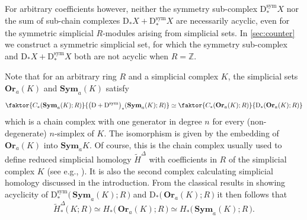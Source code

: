 \documentclass[12pt]{amsart}
\theoremstyle{plain}
\numberwithin{lemma}{\DefaultNumberTheoremWithin}
\numberwithin{claim}{\DefaultNumberTheoremWithin}
\numberwithin{theorem}{\DefaultNumberTheoremWithin}
\numberwithin{corollary}{\DefaultNumberTheoremWithin}
\numberwithin{proposition}{\DefaultNumberTheoremWithin}
\numberwithin{conjecture}{\DefaultNumberTheoremWithin}
\theoremstyle{definition}
\theoremstyle{definition}
\numberwithin{question}{\DefaultNumberTheoremWithin}
\theoremstyle{definition}
\numberwithin{problem}{\DefaultNumberTheoremWithin}
\theoremstyle{remark}
\numberwithin{remark}{\DefaultNumberTheoremWithin}
\theoremstyle{remark}
\numberwithin{example}{\DefaultNumberTheoremWithin}
\def\blt{*}
\def\ZZ{\mathbb Z}
\def\Deg{\mathrm{D}}    %
\def\sDeg{\Deg^{\mathrm{sym}}}  %
\newcommand{\DpsD}[2]{\big(\Deg+\sDeg\big)_{#1} #2} %
\begin{document}
 For arbitrary coefficients however, neither the symmetry sub-complex $\sDeg_\blt X$ nor the sum of sub-chain complexes $\Deg_\blt X + \sDeg_\blt X$ are necessarily acyclic, even for the symmetric simplicial $R$-modules arising from simplicial sets. In \ref{sec:counter} we construct a symmetric simplicial set, for which the symmetry sub-complex and $\Deg_\blt X + \sDeg_\blt X$ 
 both are not acyclic when $R = \ZZ$.

Note that for an arbitrary ring $R$ and a simplicial complex $K$, the simplicial sets $\mathbf{Or}_a(K)$ and $\mathbf{Sym}_a(K)$ satisfy
$$
\faktor{C_\blt(\mathbf{Sym}_a(K);R)}{\DpsD{\blt}{(\mathbf{Sym}_a(K);R)}} \simeq \faktor{C_\blt(\mathbf{Or}_a(K);R)}{\Deg_\blt(\mathbf{Or}_a(K);R)} 
$$
 which is a chain complex with one generator in degree $n$ for every (non-degenerate) $n$-simplex of $K$. The isomorphism is given by the embedding of $\mathbf{Or}_a(K)$ into $\mathbf{Sym}_aK$. Of course, this is the chain complex usually used to define reduced simplicial homology $\widetilde{H}^{\Delta}$ with coefficients in $R$ of the simplicial complex $K$ (see e.g., \cite{hatcher}). It is also the second complex calculating simplicial homology discussed in the introduction. From the classical results in  \cite{EilenbergSteenrodBook} showing acyclicity of $\sDeg_\blt\big(\,\mathbf{Sym}_a(K);R\,\big)$ and $\Deg_\blt\big(\,\mathbf{Or}_a(K);R\,\big)$ it then follows that
\[
\widetilde{H}^{\Delta}_\blt\big(\,K;R\,\big)\simeq H_\blt\big(\,\mathbf{Or}_a(K);R\,\big)\simeq H_\blt\big(\,\mathbf{Sym}_a(K);R\,\big).
\]
\end{document}
